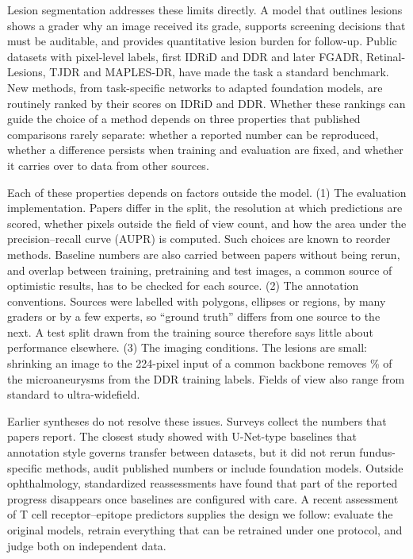 Lesion segmentation addresses these limits directly. A model that outlines lesions shows a grader why an image received its grade, supports screening decisions that must be auditable, and provides quantitative lesion burden for follow-up\cite{sebastian2023drlesionsurvey,tahir2024microaneurysmreview,dai2021deepdr}. Public datasets with pixel-level labels, first IDRiD\cite{porwal2018idrid,porwal2020idridchallenge} and DDR\cite{li2019ddr} and later FGADR\cite{zhou2021fgadr}, Retinal-Lesions\cite{wei2020retinallesionslesionnet}, TJDR\cite{mao2023tjdr} and MAPLES-DR\cite{maplesdr2024scientificdata}, have made the task a standard benchmark. New methods, from task-specific networks to adapted foundation models, are routinely ranked by their scores on IDRiD and DDR. Whether these rankings can guide the choice of a method depends on three properties that published comparisons rarely separate: whether a reported number can be reproduced, whether a difference persists when training and evaluation are fixed, and whether it carries over to data from other sources.

Each of these properties depends on factors outside the model. (1) The evaluation implementation. Papers differ in the split, the resolution at which predictions are scored, whether pixels outside the field of view count, and how the area under the precision--recall curve (AUPR) is computed. Such choices are known to reorder methods\cite{reinke2024pitfalls,maierhein2018rankings}. Baseline numbers are also carried between papers without being rerun, and overlap between training, pretraining and test images, a common source of optimistic results\cite{kapoor2023leakage}, has to be checked for each source. (2) The annotation conventions. Sources were labelled with polygons, ellipses or regions, by many graders or by a few experts\cite{kauppi2007diaretdb1}, so ``ground truth'' differs from one source to the next. A test split drawn from the training source therefore says little about performance elsewhere\cite{zech2018generalization}. (3) The imaging conditions. The lesions are small: shrinking an image to the 224-pixel input of a common backbone removes \% of the microaneurysms from the DDR training labels. Fields of view also range from standard to ultra-widefield.

Earlier syntheses do not resolve these issues. Surveys collect the numbers that papers report\cite{sebastian2023drlesionsurvey,tahir2024microaneurysmreview}. The closest study\cite{playout2024crossdatasetgeneralization} showed with U-Net-type baselines that annotation style governs transfer between datasets, but it did not rerun fundus-specific methods, audit published numbers or include foundation models. Outside ophthalmology, standardized reassessments have found that part of the reported progress disappears once baselines are configured with care\cite{isensee2021nnunet,isensee2024revisited}. A recent assessment of T cell receptor--epitope predictors\cite{lu2026tcrepitopenaturemethods} supplies the design we follow: evaluate the original models, retrain everything that can be retrained under one protocol, and judge both on independent data.

